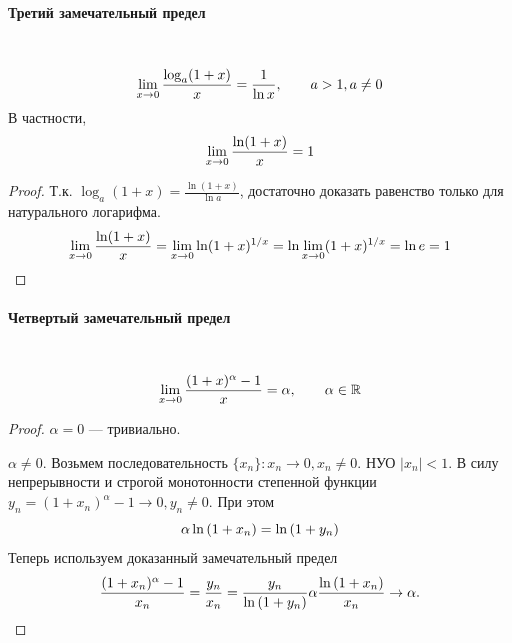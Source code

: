 \documentclass{article}
\let\vanillaparagraph\paragraph
\renewcommand{\paragraph}[1]{\vanillaparagraph{#1}\mbox{}\\}
\begin{document}
\paragraph{Третий замечательный предел}
\begin{equation}
\lim_{x\to 0} \frac{\log_a (1+x)}{x} = \frac{1} {\ln x}, \qquad a > 1, a \neq 0 \notag
\end{equation}
В частности,
\begin{equation}
\lim_{x\to 0} \frac{\ln(1 + x)} {x} = 1 \notag
\end{equation}
\begin{proof}
Т.к. $\log_a(1+x) = \frac{\ln(1+x)} {\ln a}$, достаточно доказать равенство только для натурального логарифма.
\begin{equation}
\lim_{x\to 0} \frac{\ln(1 + x)} {x} = \lim_{x\to 0} \ln(1+x)^{1/x} = \ln \lim_{x\to 0}(1 + x)^{1/x} = \ln e = 1\notag
\end{equation}
\end{proof}
\paragraph{Четвертый замечательный предел}
\begin{equation}
\lim_{x\to 0} \frac{(1 + x)^\alpha - 1} {x} = \alpha, \qquad \alpha \in \mathbb{R} \notag
\end{equation}
\begin{proof}
\item $\alpha = 0$ --- тривиально.
\item $\alpha \neq 0.$ Возьмем последовательность $\{x_n\}: x_n \to 0, x_n \neq 0$. НУО $|x_n| < 1$. В силу непрерывности и строгой монотонности степенной функции $y_n = (1+ x_n)^\alpha - 1 \to 0, y_n \neq 0.$ При этом
\begin{equation}
\alpha \ln{(1 + x_n)} = \ln{(1 + y_n)}\notag
\end{equation}
Теперь используем доказанный замечательный предел
\begin{equation}
\frac{(1 + x_n)^\alpha - 1} {x_n} = \frac{y_n} {x_n} = \frac{y_n} {\ln{( 1 + y_n)}} \alpha \frac{\ln{(1 + x_n)}} {x_n} \to \alpha. \notag
\end{equation}
\end{proof}
\end{document}
